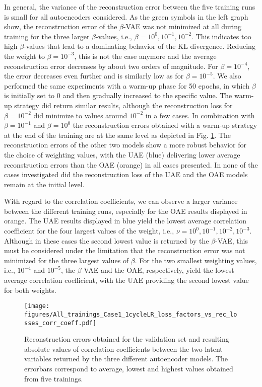In general, the variance of the reconstruction error between the five training runs is small for all autoencoders considered.
%
As the green symbols in the left graph show, the reconstruction error of the $\beta$-VAE was not minimized at all during training 
for the three larger $\beta$-values, i.e.,  $\beta=10^{0}, 10^{-1}, 10^{-2}$.  This indicates too high $\beta$-values that lead to a dominating behavior of the KL divergence. Reducing the weight to $\beta=10^{-3}$, this is not the case anymore and the average reconstruction error decreases by about two orders of magnitude. For $\beta=10^{-4}$, the error decreases even further and is similarly low as for $\beta=10^{-5}$.  {We also performed the same experiments with a warm-up phase for 50 epochs, in which $\beta$ is initially set to 0 and then gradually increased to the specific value. The warm-up strategy did return similar results, although the reconstruction loss  for $\beta=10^{-2}$  did minimize to values around $10^{-2}$ in a few cases. In combination with  $\beta=10^{-1}$ and $\beta=10^0$ the reconstruction errors obtained with a warm-up strategy at the end of the training  are at the same level as depicted in Fig. \ref{fig:1cycleLR_loss_factors_vs_rec_losses_corr_coeff}.}
The reconstruction errors of the other two models show a more robust behavior for the choice of weighting values, with the UAE (blue) delivering lower average reconstruction errors than the OAE (orange) in all cases presented. In none of the cases investigated did the reconstruction loss of the UAE and the OAE models remain at the initial level.


With regard to the correlation coefficients, we can observe a larger variance between the different training runs, especially for the OAE results displayed in orange. 
The UAE results displayed in blue yield the lowest average correlation coefficient for the four largest values of the weight, i.e., $\nu=10^{0}, 10^{-1}, 10^{-2}, 10^{-3}$. 
Although in these cases the second lowest value is returned by the $\beta$-VAE, this must be considered under the limitation that the reconstruction error was not minimized for the three largest values of $\beta$. 
For the two smallest weighting values, i.e., $10^{-4}$ and $10^{-5}$, the $\beta$-VAE and the OAE, respectively, yield the lowest average correlation coefficient, with the UAE providing the second lowest value for both weights.

\begin{figure}[h!]
    \centering
    \texttt{[image: figures/All\_trainings\_Case1\_1cycleLR\_loss\_factors\_vs\_rec\_losses\_corr\_coeff.pdf]}
    \caption{Reconstruction errors obtained for the validation set and resulting absolute values of correlation coefficients between the two latent variables returned by the three different autoencoder models. The errorbars correspond to average, lowest and highest values obtained from five trainings.}
    \label{fig:1cycleLR_loss_factors_vs_rec_losses_corr_coeff}
\end{figure}




